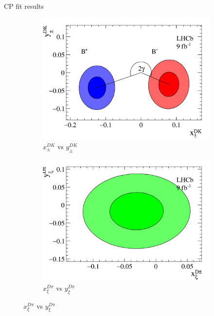 \documentclass{beamer}
\begin{document}
\begin{frame}{CP fit results}
  \begin{figure}
    \centering
    \vspace{-0.2cm}
    \begin{subfigure}{0.5\textwidth}
      \includegraphics[width = 1.0\textwidth]{Plots/B2DK_CP_Observables_Contours.png}
      \caption{$x_\pm^{DK}$ vs $y_\pm^{DK}$}
    \end{subfigure}%
    \begin{subfigure}{0.5\textwidth}
      \includegraphics[width = 1.0\textwidth]{Plots/B2Dpi_CP_Observables_Contours.png}
      \caption{$x_\xi^{D\pi}$ vs $y_\xi^{D\pi}$}
    \end{subfigure}
  \end{figure}
\end{frame}
\end{document}
